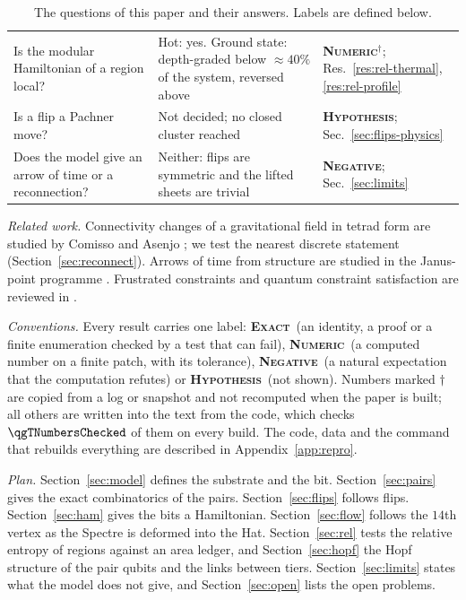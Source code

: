 \documentclass[11pt]{article}
\newcommand{\exact}{\textbf{\textsc{Exact}}}
\newcommand{\numeric}{\textbf{\textsc{Numeric}}}
\newcommand{\hypo}{\textbf{\textsc{Hypothesis}}}
\newcommand{\negres}{\textbf{\textsc{Negative}}}
\theoremstyle{definition}
\begin{document}
\begin{table}[t]
\begin{tabular}{@{}p{58mm}p{50mm}p{20mm}@{}}
Is the modular Hamiltonian of a region local? & Hot: yes. Ground state: depth-graded below $\approx40\%$ of the system, reversed above & \numeric$^\dagger$; Res.~\ref{res:rel-thermal}, \ref{res:rel-profile} \\
Is a flip a Pachner move? & Not decided; no closed cluster reached & \hypo; Sec.~\ref{sec:flips-physics} \\
Does the model give an arrow of time or a reconnection? & Neither: flips are symmetric and the lifted sheets are trivial & \negres; Sec.~\ref{sec:limits} \\
\bottomrule
\end{tabular}
\caption{The questions of this paper and their answers. Labels are defined below.}\label{tab:answers}
\end{table}

\emph{Related work.} Connectivity changes of a gravitational field in tetrad form are studied by Comisso and Asenjo \cite{comisso2026}; we test the nearest discrete statement (Section~\ref{sec:reconnect}). Arrows of time from structure are studied in the Janus-point programme \cite{barbourlobo2026}. Frustrated constraints and quantum constraint satisfaction are reviewed in \cite{gharibian2015}.

\emph{Conventions.} Every result carries one label: \exact\ (an identity, a proof or a finite enumeration checked by a test that can fail), \numeric\ (a computed number on a finite patch, with its tolerance), \negres\ (a natural expectation that the computation refutes) or \hypo\ (not shown). Numbers marked $\dagger$ are copied from a log or snapshot and not recomputed when the paper is built; all others are written into the text from the code, which checks $\qgTNumbersChecked$ of them on every build. The code, data and the command that rebuilds everything are described in Appendix~\ref{app:repro}.

\emph{Plan.} Section~\ref{sec:model} defines the substrate and the bit. Section~\ref{sec:pairs} gives the exact combinatorics of the pairs. Section~\ref{sec:flips} follows flips. Section~\ref{sec:ham} gives the bits a Hamiltonian. Section~\ref{sec:flow} follows the $14$th vertex as the Spectre is deformed into the Hat. Section~\ref{sec:rel} tests the relative entropy of regions against an area ledger, and Section~\ref{sec:hopf} the Hopf structure of the pair qubits and the links between tiers. Section~\ref{sec:limits} states what the model does not give, and Section~\ref{sec:open} lists the open problems.

\end{document}
